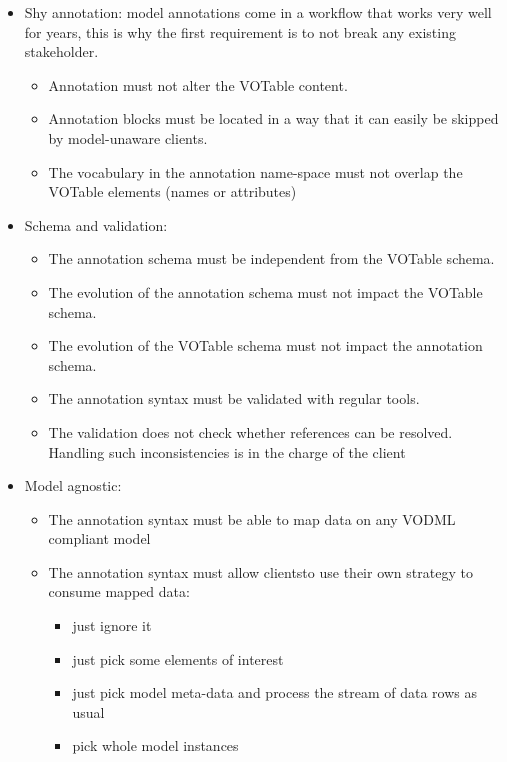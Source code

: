 \begin {itemize}
  \item Shy annotation: model annotations come in a workflow that works very well for years, this is why the first requirement is to not break any existing stakeholder.
  \begin {itemize}
    \item Annotation must not alter the VOTable content.
    \item Annotation blocks must be located in a way that it can easily be skipped by model-unaware clients.
    \item The vocabulary in the annotation name-space must not overlap the VOTable elements (names or attributes)    
  \end {itemize}
  
  \item Schema and validation:
  \begin {itemize}
    \item The annotation schema must be independent from the VOTable schema.
    \item The evolution of the annotation schema must not impact the VOTable schema.
    \item The evolution of the VOTable schema must not impact the annotation schema.
    \item The annotation syntax must be validated with regular tools.
    \item The validation does not check whether references can be resolved.  Handling such inconsistencies is in the charge of the client
  \end {itemize}
  
  \item Model agnostic:
  \begin {itemize}
    \item The annotation syntax must be able to map data on any VODML compliant model
    \item The annotation syntax must allow clientsto use their own strategy to consume mapped data:
      \begin {itemize}
        \item just ignore it
        \item just pick some elements of interest 
        \item just pick model meta-data and process the stream of data rows as usual
        \item pick whole model instances
      \end {itemize}
  \end {itemize}
  
\end {itemize}
